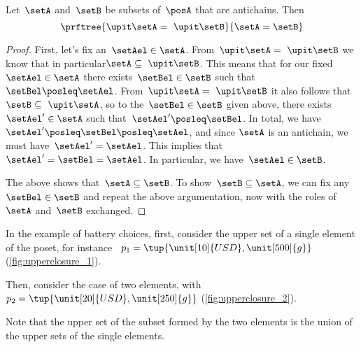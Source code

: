 \begin{lemma}
  \label{lem:up-cl-inj-antichains}
  Let~$\setA$ and~$\setB$ be subsets of~$\posA$ that are antichains. Then
  \begin{equation*}
    \prftree{\upit  \setA = \ \upit  \setB}{\setA = \setB}
  \end{equation*}
\end{lemma}

\begin{proof}
  First, let's fix an~$\setAel \in \setA$.
  From~$\upit  \setA = \ \upit  \setB$ we know that in particular$\setA \subseteq \ \upit  \setB$.
  This means that for our fixed~$\setAel \in \setA$ there exists~$\setBel \in \setB$ such that~$\setBel \posleq \setAel$.
  From~$\upit \setA = \ \upit  \setB$ it also follows that~$\setB \subseteq \ \upit  \setA$, so to the~$\setBel \in \setB$ given above, there exists~$\setAel' \in \setA$ such that~$\setAel' \posleq \setBel$.
  In total, we have~$\setAel' \posleq \setBel \posleq \setAel$, and since $\setA$ is an antichain, we must have~$\setAel' = \setAel$.
  This implies that~$\setAel' = \setBel = \setAel$. In particular, we have~$\setAel \in \setB$.

  The above shows that~$\setA \subseteq \setB$.
  To show~$\setB \subseteq \setA$, we can fix any~$\setBel \in \setB$ and repeat the above argumentation, now with the roles of~$\setA$ and~$\setB$ exchanged.
\end{proof}

In the example of battery choices, first, consider the upper set of a single element of the poset, for instance ~$p_1=\tup{\unit[10]{USD},\unit[500]{g}}$ (\cref{fig:upperclosure_1}).
\begin{figure*}[h!]
  \begin{center}
  \end{center}
  \caption{The upper closure of a singleton set of battery choices. }
  \label{fig:upperclosure_1}
\end{figure*}
Then, consider the case of two elements, with~$p_2=\tup{\unit[20]{USD},\unit[250]{g}}$ (\cref{fig:upperclosure_2}).

\begin{figure*}[h!]
  \begin{center}
  \end{center}
  \caption{The upper closure of a set of battery choices.  }
  \label{fig:upperclosure_2}
\end{figure*}
Note that the upper set of the subset formed by the two elements is the union of the upper sets of the single elements.

